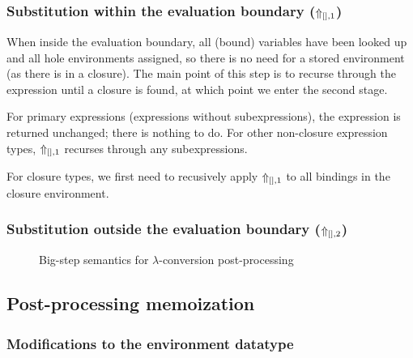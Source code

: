 \subsubsection{Substitution within the evaluation boundary ($\Uparrow_{[],1}$)}
\label{sec:postprocessing-subst-inside}

When inside the evaluation boundary, all (bound) variables have been looked up and all hole environments assigned, so there is no need for a stored environment (as there is in a closure). The main point of this step is to recurse through the expression until a closure is found, at which point we enter the second stage.

For primary expressions (expressions without subexpressions), the expression is returned unchanged; there is nothing to do. For other non-closure expression types, $\Uparrow_{[],1}$ recurses through any subexpressions.

For closure types, we first need to recusively apply $\Uparrow_{[],1}$ to all bindings in the closure environment.

\subsubsection{Substitution outside the evaluation boundary ($\Uparrow_{[],2}$)}
\label{sec:postprocessing-subst-outside}



\begin{figure}
  \centering
  \begin{mdframed}
    \begin{singlespace}
      
    \end{singlespace}
  \end{mdframed}
  \caption{Big-step semantics for $\lambda$-conversion post-processing}
  \label{fig:big-step-inside-formal}
\end{figure}

\subsection{Post-processing memoization}
\label{sec:memoization}

\subsubsection{Modifications to the environment datatype}
\label{sec:memoization-evalenv}

